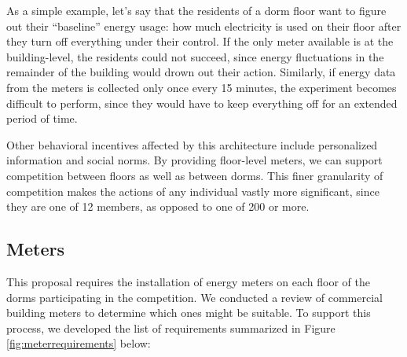 \documentclass[11pt]{article}
\begin{document}
As a simple example, let's say that the residents of a dorm floor want to
figure out their ``baseline'' energy usage: how much electricity is used on
their floor after they turn off everything under their control.  If the
only meter available is at the building-level, the residents could not
succeed, since energy fluctuations in the remainder of the building would
drown out their action.  Similarly, if energy data from the meters is collected
only once every 15 minutes, the experiment becomes difficult to perform,
since they would have to keep everything off for an extended period of
time.  

Other behavioral incentives affected by this architecture include
personalized information and social norms.  By providing floor-level
meters, we can support competition between floors as well as between dorms.
This finer granularity of competition makes the actions of any individual
vastly more significant, since they are one of 12 members, as opposed to
one of 200 or more.

\subsection{Meters}
\label{sec:meters}

This proposal requires the installation of energy meters on each floor of
the dorms participating in the competition.  We conducted a review of
commercial building meters to determine which ones might be
suitable.  To support this process, we developed the list of
requirements summarized in Figure \ref{fig:meterrequirements} below:
\end{document}
